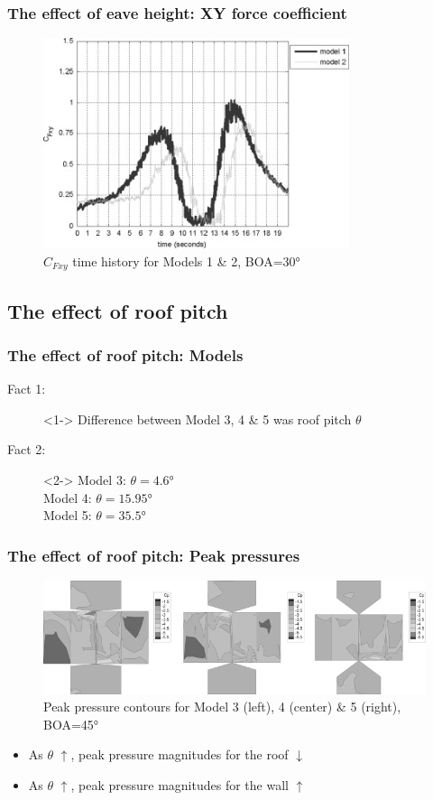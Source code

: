 \documentclass{beamer}
\begin{document}
\begin{frame}
	\frametitle{The effect of eave height: XY force coefficient}
	\begin{figure}
			\includegraphics[width=0.8\textwidth]{./fig/6.jpg}
			\caption{$C_{Fxy}$ time history for Models 1 \& 2, BOA=\ang{30}}
		\end{figure}
\end{frame}

\subsection{The effect of roof pitch}
\begin{frame}
	\frametitle{The effect of roof pitch: Models}
	\begin{description}
		\item[Fact 1: ]<1-> Difference between Model 3, 4  \& 5 was \alert{roof pitch $\theta$}
		\item[Fact 2: ]<2-> Model 3:  $\theta=\ang{4.6}$ \\
		                                         Model 4:  $\theta=\ang{15.95}$ \\
		                                         Model 5:  $\theta=\ang{35.5}$
	\end{description}
\end{frame}

\begin{frame}
	\frametitle{The effect of roof pitch: Peak pressures}
	\begin{figure}
		\centering
		\includegraphics[width=\textwidth]{./fig/7.jpg}
		\caption{Peak pressure contours for Model 3 (left), 4 (center) \& 5 (right), BOA=\ang{45}}
	\end{figure}
	\begin{itemize}
		\item As $\theta$ $\uparrow$, peak pressure magnitudes for the \alert{roof} $\downarrow$
		\item As $\theta$ $\uparrow$, peak pressure magnitudes for the \alert{wall} $\uparrow$
	\end{itemize}
\end{frame}
\end{document}
